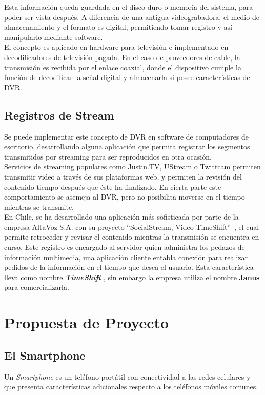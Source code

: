  Esta información queda guardada en el disco duro o memoria del sistema, para poder ser vista después. A diferencia de una antigua videograbadora, el medio de almacenamiento y el formato es digital, permitiendo tomar registro y así manipularlo mediante software.\\
 
	El concepto es aplicado en hardware para televisión e implementado en decodificadores de televisión pagada. En el caso de proveedores de cable, la transmisión es recibida por el enlace coaxial, donde el dispositivo cumple la función de decodificar la señal digital y almacenarla si posee características de DVR.

\subsection{Registros de Stream}

Se puede implementar este concepto de DVR en software de computadores de escritorio, desarrollando alguna aplicación que permita registrar los segmentos transmitidos por streaming para ser reproducidos en otra ocasión. \\

	Servicios de streaming populares como Justin.TV, UStream o Twittcam permiten transmitir video a través de sus plataformas web, y permiten la revisión del contenido tiempo después que éste ha finalizado. En cierta parte este comportamiento se asemeja al DVR, pero no posibilita moverse en el tiempo mientras se transmite.\\

En Chile, se ha desarrollado una aplicación más sofisticada por parte de la empresa AltaVoz S.A. con su proyecto \textquotedblleft SocialStream, Video TimeShift\textquotedblright \ , el cual permite retroceder y revisar el contenido mientras la transmisión se encuentra en curso. Este registro es encargado al servidor quien administra los pedazos de información multimedia, una aplicación cliente entabla conexión para realizar pedidos de la información en el tiempo que desea el usuario.
Esta característica lleva como nombre \textbf{\textit{TimeShift}} \cite{cap1:time-shift}, sin embargo la empresa utiliza el nombre \textbf{Janus} \cite{cap1:altavoz-janus} para comercializarla.

\section{Propuesta de Proyecto}
\subsection{El Smartphone}
Un \textit{Smartphone} es un teléfono portátil con conectividad a las redes celulares y que presenta características adicionales respecto a los teléfonos móviles comunes.\\


